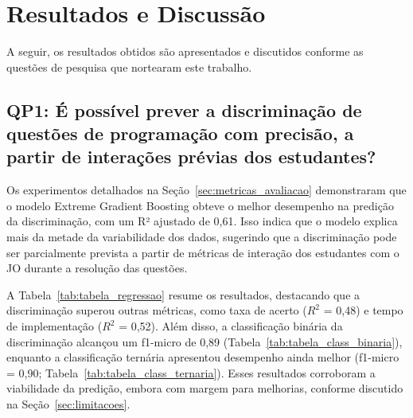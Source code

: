 \documentclass[12pt]{article}
\begin{document}
\section{Resultados e Discussão}
\label{sec:resultados}

A seguir, os resultados obtidos são apresentados e discutidos conforme as questões de pesquisa que nortearam este trabalho.

\subsection{QP1: É possível prever a discriminação de questões de programação com precisão, a partir de interações prévias dos estudantes?}
\label{sec:resultados_QP1}

Os experimentos detalhados na Seção~\ref{sec:metricas_avaliacao} demonstraram que o modelo Extreme Gradient Boosting obteve o melhor desempenho na predição da discriminação, com um R² ajustado de 0,61. Isso indica que o modelo explica mais da metade da variabilidade dos dados, sugerindo que a discriminação pode ser parcialmente prevista a partir de métricas de interação dos estudantes com o JO durante a resolução das questões.

A Tabela~\ref{tab:tabela_regressao} resume os resultados, destacando que a discriminação superou outras métricas, como taxa de acerto ($R^2$ = 0,48) e tempo de implementação ($R^2$ = 0,52). Além disso, a classificação binária da discriminação alcançou um f1-micro de 0,89 (Tabela~\ref{tab:tabela_class_binaria}), enquanto a classificação ternária apresentou desempenho ainda melhor (f1-micro = 0,90; Tabela~\ref{tab:tabela_class_ternaria}). Esses resultados corroboram a viabilidade da predição, embora com margem para melhorias, conforme discutido na Seção~\ref{sec:limitacoes}.
\end{document}
